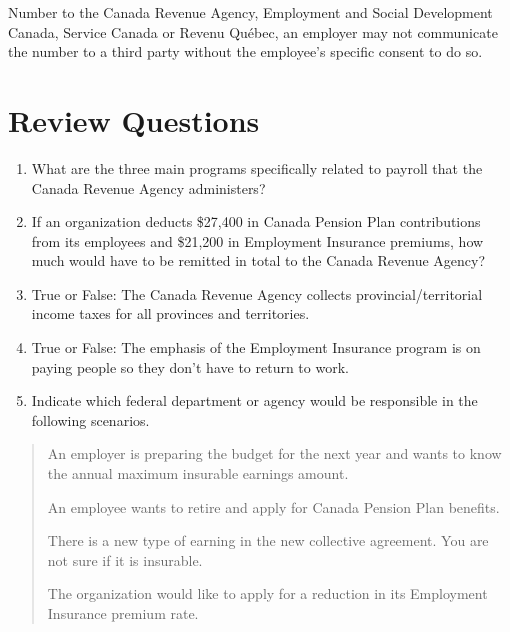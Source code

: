 \documentclass[letterpaper,10pt,english]{sphinxmanual}
\begin{document}
\sphinxAtStartPar
Number to the Canada Revenue Agency, Employment and Social Development
Canada, Service Canada or Revenu Québec, an employer may not communicate the
number to a third party without the employee’s specific consent to do so.


\section{Review Questions}
\label{\detokenize{2_compliance:review-questions}}\begin{enumerate}
%
\item {} 
\sphinxAtStartPar
What are the three main programs specifically related to payroll that the Canada Revenue Agency administers?

\item {} 
\sphinxAtStartPar
If an organization deducts \$27,400 in Canada Pension Plan contributions from its employees and \$21,200 in Employment Insurance premiums, how much would have to be remitted in total to the Canada Revenue Agency?

\item {} 
\sphinxAtStartPar
True or False: The Canada Revenue Agency collects provincial/territorial income taxes for all provinces and territories.

\item {} 
\sphinxAtStartPar
True or False: The emphasis of the Employment Insurance program is on paying people so they don’t have to return to work.

\item {} 
\sphinxAtStartPar
Indicate which federal department or agency would be responsible in the following scenarios.

\end{enumerate}
\begin{quote}

\sphinxAtStartPar
An employer is preparing the budget for the next year and wants to know the annual maximum insurable earnings amount.

\sphinxAtStartPar
An employee wants to retire and apply for Canada Pension Plan benefits.

\sphinxAtStartPar
There is a new type of earning in the new collective agreement. You are not sure if it is insurable.

\sphinxAtStartPar
The organization would like to apply for a reduction in its Employment Insurance premium rate.
\end{quote}
\end{document}
